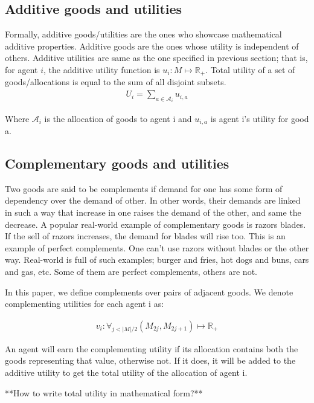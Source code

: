 \subsection{Additive goods and utilities}
Formally, additive goods/utilities are the ones who showcase mathematical additive properties. Additive goods are the ones whose utility is independent of others. Additive utilities are same as the one specified in previous section; that is, for agent $i$, the additive utility function is $u_i: M\mapsto \mathbb{R_+}$. Total utility of a set of goods/allocations is equal to the sum of all disjoint subsets.
\begin{gather}
    U_i = \sum_{a \in \mathcal{A}_i} u_{i,a}
\end{gather}

Where $\mathcal{A}_i$ is the allocation of goods to agent i and $u_{i,a}$ is agent i's utility for good a.

\subsection{Complementary goods and utilities}
\label{section_complementary}

Two goods are said to be complements if demand for one has some form of dependency over the demand of other. In other words, their demands are linked in such a way that increase in one raises the demand of the other, and same the decrease. A popular real-world example of complementary goods is razors blades. If the sell of razors increases, the demand for blades will rise too. This is an example of perfect complements. One can't use razors without blades or the other way. Real-world is full of such examples; burger and fries, hot dogs and buns, cars and gas, etc. Some of them are perfect complements, others are not.

In this paper, we define complements over pairs of adjacent goods. We denote complementing utilities for each agent i as: 

\begin{gather}
    v_i: \forall_{j < |M|/2} (M_{2j}, M_{2j+1})\mapsto \mathbb{R_+}
\end{gather}

An agent will earn the complementing utility if its allocation contains both the goods representing that value, otherwise not. If it does, it will be added to the additive utility to get the total utility of the allocation of agent i.

**How to write total utility in mathematical form?**

